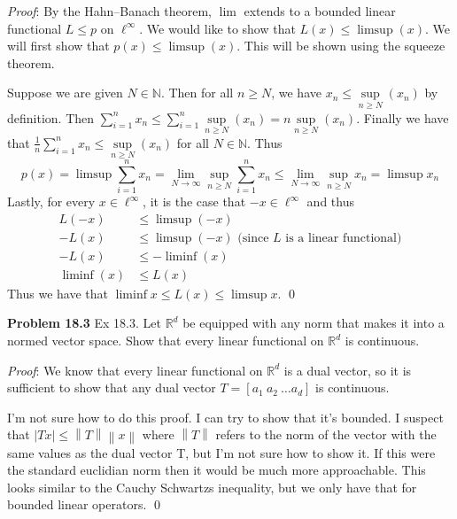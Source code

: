 \documentclass[12pt]{article}
\newcommand{\problem}[1]{\hspace{-4 ex} \large \textbf{Problem #1} }
\newcommand{\norm}[1]{\left\lVert#1\right\rVert}
\renewenvironment{proof}{\hspace{-4 ex} \emph{Proof}:}{\qed}
\newcommand{\RR}{\mathbb{R}}
\newcommand{\NN}{\mathbb{N}}
\begin{document}
\begin{proof}
		By the Hahn--Banach theorem, $\lim$ extends to a bounded linear functional $L \leq p$ on $\ell^\infty$. 
		We would like to show that $L(x)\leq \limsup(x)$. We will first show that $p(x) \leq \limsup(x)$. This will be shown using the squeeze theorem. \bigbreak
		
		Suppose we are given $N \in \NN$. Then for all $n \geq N$, we have $x_n \leq \sup\limits_{n \geq N}(x_n)$ by definition. Then $\sum\limits_{i=1}^n x_n \leq \sum\limits_{i=1}^n \sup\limits_{n \geq N}(x_n) = n \sup\limits_{n \geq N}(x_n)$. Finally we have that $\tfrac{1}{n}\sum\limits_{i=1}^n x_n \leq \sup\limits_{n \geq N}(x_n)$ for all $N \in \NN$. Thus
		$$
		p(x) = \limsup\sum\limits_{i=1}^n x_n = \lim_{N \to \infty} \sup\limits_{n \geq N}\sum\limits_{i=1}^n x_n \leq \lim_{N \to \infty} \sup\limits_{n \geq N} x_n = \limsup x_n
		$$
		Lastly, for every $x \in \ell^\infty$, it is the case that $-x \in \ell^\infty$ and thus
		\begin{align*}
			L(-x) & \leq \limsup(-x) \\
			-L(x) & \leq \limsup(-x) \text{\ \ (since $L$ is a linear functional)} \\
			-L(x) & \leq -\liminf(x) \\
			\liminf(x) & \leq L(x)
		\end{align*}
		Thus we have that $\liminf x \leq L(x) \leq \limsup x$.
	\end{proof}

\problem{18.3}
Ex 18.3. Let $\RR^d$ be equipped with any norm that makes it into a normed vector space. Show that every linear functional on $\RR^d$ is continuous.

	\begin{proof}
		We know that every linear functional on $\RR^d$ is a dual vector, so it is sufficient to show that any dual vector $T=[a_1\ a_2\ \dots a_d]$ is continuous. \bigbreak
		
		I'm not sure how to do this proof. I can try to show that it's bounded. I suspect that $\vert Tx \vert \leq \norm{T}\norm{x}$ where $\norm{T}$ refers to the norm of the vector with the same values as the dual vector T, but I'm not sure how to show it. If this were the standard euclidian norm then it would be much more approachable. This looks similar to the Cauchy Schwartzs inequality, but we only have that for bounded linear operators.
	\end{proof}
\end{document}
